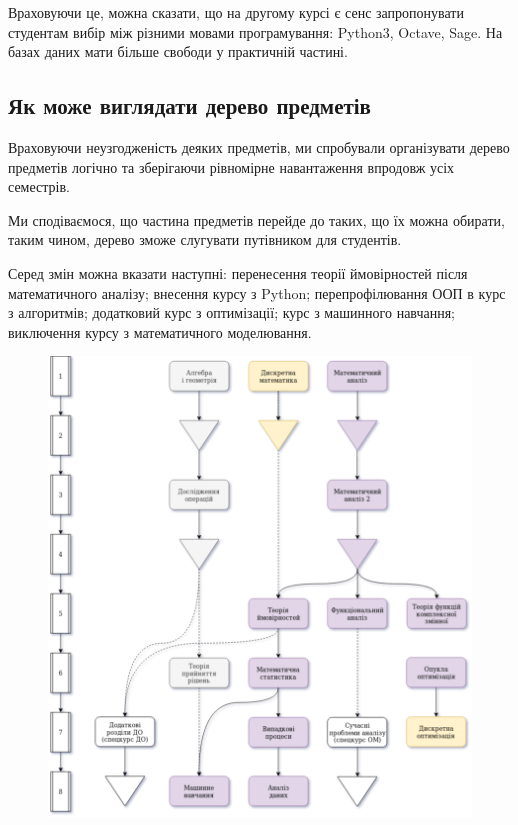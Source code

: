 \documentclass[14pt, a4paper]{extarticle}  %
\begin{document}

Враховуючи це, можна сказати, що на другому курсі є сенс запропонувати студентам вибір між різними мовами програмування: Python3, Octave, Sage. 
На базах даних мати більше свободи у практичній частині. 

\subsection{Як може виглядати дерево предметів}
Враховуючи неузгодженість деяких предметів, ми спробували організувати дерево предметів логічно та зберігаючи рівномірне навантаження впродовж усіх семестрів.

Ми сподіваємося, що частина предметів перейде до таких, що їх можна обирати, таким чином, дерево зможе слугувати путівником для студентів.

Серед змін можна вказати наступні: перенесення теорії ймовірностей після математичного аналізу; внесення курсу з Python; перепрофілювання ООП в курс з алгоритмів; додатковий курс з оптимізації; курс з машинного навчання; виключення курсу з математичного моделювання. 

\begin{figure}[H]
\centering
\includegraphics[scale=0.57]{CourseworkTree_1.png}
\end{figure}
\end{document}
